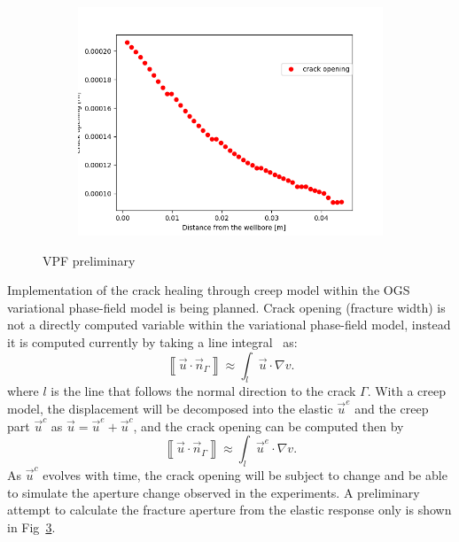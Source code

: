 \begin{figure}[!ht]
\begin{subfigure}[c]{0.49\textwidth}
\label{fig:ME3_VPF_model}
\end{subfigure}
\hfill
\begin{subfigure}[c]{0.49\textwidth}
\includegraphics[width=1\textwidth]{figures/ME3_CrackWidth.png}
\label{fig:ME3_VPF_crack width}
\end{subfigure}
\caption{VPF preliminary}
\label{fig:VPF_ME2_creep}
\end{figure}

Implementation of the crack healing through creep model within the OGS variational phase-field model is being planned.
Crack opening (fracture width) is not a directly computed variable within the variational phase-field model, instead it is computed currently by taking a line integral~\cite{Yoshioka2020} as:
\begin{equation}
\left \llbracket \vec{u}\cdot \vec{n}_\Gamma \right\rrbracket
\approx \int_{l} \vec{u} \cdot \nabla v .
\label{eq:width_line_integral}
\end{equation}
where $l$ is the line that follows the normal direction to the crack $\Gamma$.
With a creep model, the displacement will be decomposed into the elastic $\vec{u}^e$ and the creep part $\vec{u}^c$ as $\vec{u} = \vec{u}^e+\vec{u}^c$, and the crack opening can be computed then by
\begin{equation}
\left \llbracket \vec{u}\cdot \vec{n}_\Gamma \right\rrbracket
\approx \int_{l} \vec{u}^e \cdot \nabla v .
\label{eq:width_line_integral}
\end{equation}
As $\vec{u}^c$ evolves with time, the crack opening will be subject to change and be able to simulate the aperture change observed in the experiments.
A preliminary attempt to calculate the fracture aperture from the elastic response only is shown in  Fig~\ref{fig:VPF_ME2_creep}.

